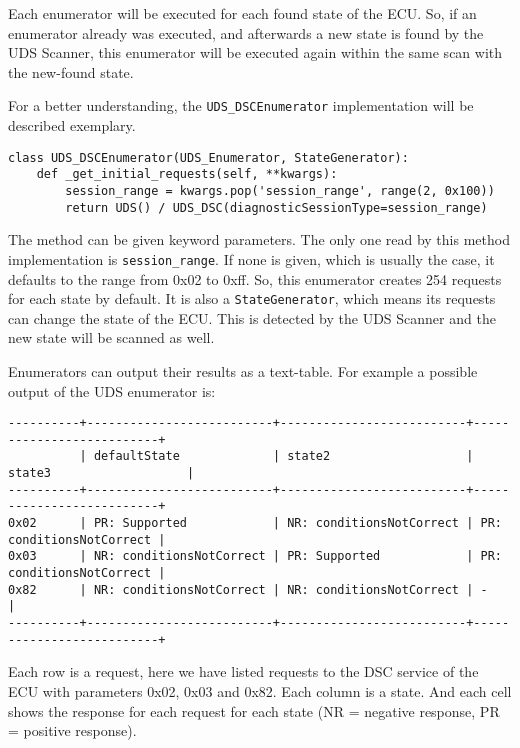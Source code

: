 Each enumerator will be executed for each found state of the ECU. So, if an enumerator already was executed, and afterwards a new state is found by the UDS Scanner, this enumerator will be executed again within the same scan with the new-found state.

For a better understanding, the \texttt{UDS_DSCEnumerator} implementation will be described exemplary.

\begin{samepage}
\begin{verbatim}
class UDS_DSCEnumerator(UDS_Enumerator, StateGenerator):
    def _get_initial_requests(self, **kwargs):
        session_range = kwargs.pop('session_range', range(2, 0x100))
        return UDS() / UDS_DSC(diagnosticSessionType=session_range)
\end{verbatim}
\end{samepage}

The method can be given keyword parameters. The only one read by this method implementation is \texttt{session_range}. If none is given, which is usually the case, it defaults to the range from 0x02 to 0xff. So, this enumerator creates 254 requests for each state by default. It is also a \texttt{StateGenerator}, which means its requests can change the state of the ECU. This is detected by the UDS Scanner and the new state will be scanned as well.

Enumerators can output their results as a text-table. For example a possible output of the UDS enumerator is:

\begin{samepage}
\begin{verbatim}
----------+--------------------------+--------------------------+--------------------------+
          | defaultState             | state2                   | state3                   | 
----------+--------------------------+--------------------------+--------------------------+
0x02      | PR: Supported            | NR: conditionsNotCorrect | PR: conditionsNotCorrect | 
0x03      | NR: conditionsNotCorrect | PR: Supported            | PR: conditionsNotCorrect | 
0x82      | NR: conditionsNotCorrect | NR: conditionsNotCorrect | -                        | 
----------+--------------------------+--------------------------+--------------------------+
\end{verbatim}
\end{samepage}

Each row is a request, here we have listed requests to the DSC service of the ECU with parameters 0x02, 0x03 and 0x82. Each column is a state. And each cell shows the response for each request for each state (NR = negative response, PR = positive response).

